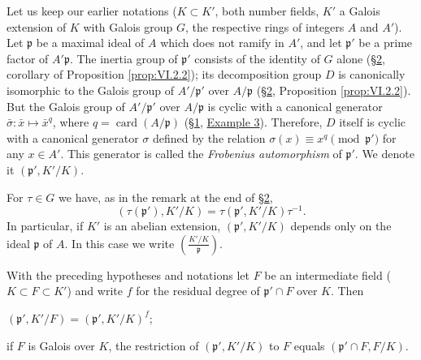 Let us keep our earlier notations ($K\subset K'$, both number fields, $K'$
a Galois extension of $K$ with Galois group $G$, the respective rings of
integers $A$ and $A'$). Let $\mathfrak{p}$ be a maximal ideal of $A$ which
does not ramify in $A'$, and let $\mathfrak{p}'$ be a prime factor of
$A'\mathfrak{p}$. The inertia group of $\mathfrak{p}'$ consists of the
identity of $G$ alone (\hyperref[sec:6.2]{§2}, corollary of Proposition \ref{prop:VI.2.2});
its decomposition group $D$ is canonically isomorphic to the Galois group
of $A'/\mathfrak{p}'$ over $A/\mathfrak{p}$ (\hyperref[sec:6.2]{§2}, Proposition
\ref{prop:VI.2.2}). But the Galois group of $A'/\mathfrak{p}'$ over
$A/\mathfrak{p}$ is cyclic with a canonical generator
$\bar{\sigma}:\bar{x}\mapsto\bar{x}^{q}$, where
$q=\operatorname{card}(A/\mathfrak{p})$ (\hyperref[sec:6.1]{§1}, \hyperref[exa:VI.1.3]{Example 3}). Therefore, $D$
itself is cyclic with a canonical generator $\sigma$ defined by the
relation $\sigma(x)\equiv x^{q}\pmod{\mathfrak{p}'}$ for any $x\in A'$.
This generator is called the \emph{Frobenius automorphism} of
$\mathfrak{p}'$. We denote it $(\mathfrak{p}',K'/K)$.

For $\tau\in G$ we have, as in the remark at the end of \hyperref[sec:6.2]{§2},
\begin{equation}
(\tau(\mathfrak{p}'),K'/K)
=\tau(\mathfrak{p}',K'/K)\tau^{-1}.
\label{eq:VI.3.1}
\end{equation}
In particular, if $K'$ is an abelian extension,
$(\mathfrak{p}',K'/K)$ depends only on the ideal $\mathfrak{p}$ of $A$.
In this case we write
$\left(\frac{K'/K}{\mathfrak{p}}\right)$.

\begin{proposition}
\label{prop:VI.3.1}
With the preceding hypotheses and notations let $F$ be an intermediate
field ($K\subset F\subset K'$) and write $f$ for the residual degree of
$\mathfrak{p}'\cap F$ over $K$. Then
\begin{alist}
\item $(\mathfrak{p}',K'/F)=(\mathfrak{p}',K'/K)^{f}$;
\item if $F$ is Galois over $K$, the restriction of
$(\mathfrak{p}',K'/K)$ to $F$ equals
$(\mathfrak{p}'\cap F,F/K)$.
\end{alist}
\end{proposition}

